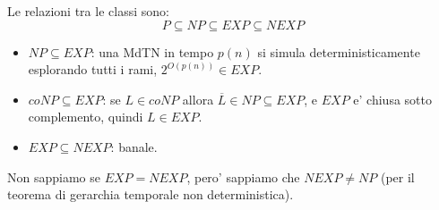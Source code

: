 Le relazioni tra le classi sono:
\[
  P \subseteq NP \subseteq EXP \subseteq NEXP
\]
\begin{itemize}
  \item $NP \subseteq EXP$: una MdTN in tempo $p(n)$ si simula deterministicamente esplorando tutti i rami, $2^{O(p(n))} \in EXP$.
  \item $coNP \subseteq EXP$: se $L \in coNP$ allora $\overline{L} \in NP \subseteq EXP$, e $EXP$ e' chiusa sotto complemento, quindi $L \in EXP$.
  \item $EXP \subseteq NEXP$: banale.
\end{itemize}

Non sappiamo se $EXP = NEXP$, pero' sappiamo che $NEXP \neq NP$ (per il teorema di gerarchia temporale non deterministica).


% 
